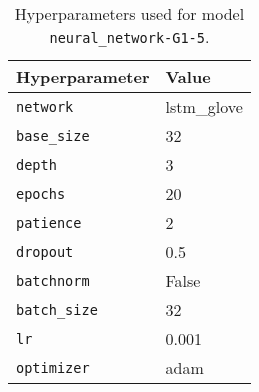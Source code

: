 \begin{table}[H]
\centering
\capstart
\begin{tabularx}{0.48\textwidth}{|X|l|}
\hline
Hyperparameter & Value \\
\hline
\texttt{network} & lstm\_glove \\
\texttt{base\_size} & 32 \\
\texttt{depth} & 3 \\
\texttt{epochs} & 20 \\
\texttt{patience} & 2 \\
\texttt{dropout} & 0.5 \\
\texttt{batchnorm} & False \\
\texttt{batch\_size} & 32 \\
\texttt{lr} & 0.001 \\
\texttt{optimizer} & adam \\
\hline
\end{tabularx}
\caption{Hyperparameters used for model \texttt{neural\_network-G1-5}.}
\label{tab:hyperparameters_best_neural_network}

\end{table}
